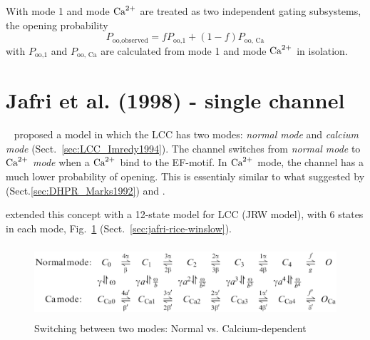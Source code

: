 With mode 1 and mode ${\text{Ca}^{2+}}$ are treated as two independent gating subsystems, the
opening probability
\begin{equation}
P_\text{oo,observed} = fP_\text{oo,1}+(1-f)P_\text{oo, Ca}
\end{equation}
with $P_\text{oo,1}$ and $P_\text{oo, Ca}$ are calculated from mode 1 and mode
${\text{Ca}^{2+}}$ in isolation.


\section{Jafri et al. (1998) - single channel}
\label{sec:LCC_Jafri1998}

~\citep{imredy1994mcs} proposed a model in which the LCC has two modes: {\it
normal mode} and {\it calcium mode} (Sect.~\ref{sec:LCC_Imredy1994}). The
channel switches from {\it normal mode} to ${\text{Ca}^{2+}}$ {\it mode} when a ${\text{Ca}^{2+}}$ bind to
the EF-motif. In ${\text{Ca}^{2+}}$ mode, the channel has a much lower probability of
opening. This is essentialy similar to what suggested by \citep{marks1992}
(Sect.\ref{sec:DHPR_Marks1992}) and \citep{hess1984}.

\citep{jafri1998cad} extended this concept with a 12-state model for LCC (JRW
model), with 6 states in each mode, Fig.~\ref{fig:Jafri_mode}
(Sect.~\ref{sec:jafri-rice-winslow}).


% 

\begin{figure}[hbt]
  \centerline{\includegraphics[height=2.7cm,
    angle=0]{./images/Jafri_mode_switching.eps}}
  \caption{Switching between two modes: Normal vs. Calcium-dependent}
  \label{fig:Jafri_mode}
\end{figure}

